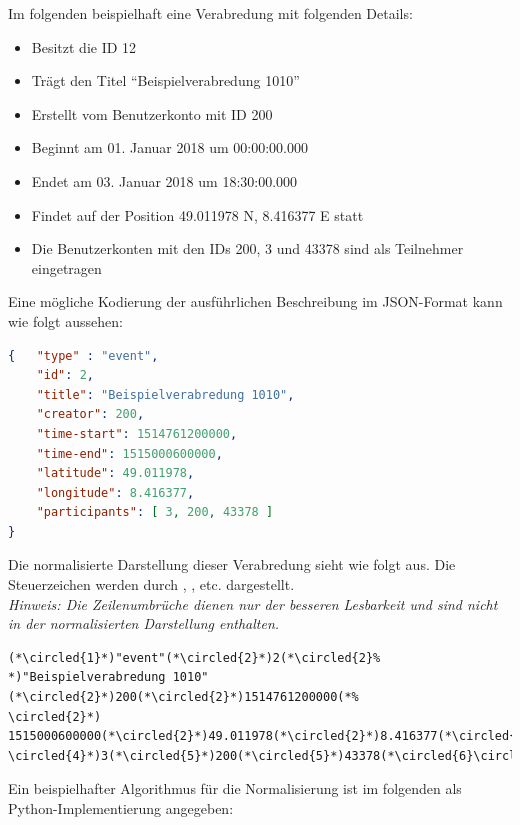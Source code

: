 \documentclass[parskip=full,11pt]{scrartcl}
\begin{document}
\par Im folgenden beispielhaft eine Verabredung mit folgenden Details:
\begin{itemize}
    \item Besitzt die ID 12
    \item Trägt den Titel \enquote{Beispielverabredung 1010}
    \item Erstellt vom Benutzerkonto mit ID 200
    \item Beginnt am 01. Januar 2018 um 00:00:00.000
    \item Endet am 03. Januar 2018 um 18:30:00.000
    \item Findet auf der Position 49.011978 N, 8.416377 E statt
    \item Die Benutzerkonten mit den IDs 200, 3 und 43378 sind als Teilnehmer
        eingetragen
\end{itemize}

Eine mögliche Kodierung der ausführlichen Beschreibung im JSON-Format kann wie
folgt aussehen:
\begin{lstlisting}[language=json,firstnumber=1]
{   "type" : "event",
    "id": 2,
    "title": "Beispielverabredung 1010",
    "creator": 200,
    "time-start": 1514761200000,
    "time-end": 1515000600000,
    "latitude": 49.011978,
    "longitude": 8.416377,
    "participants": [ 3, 200, 43378 ]
}
\end{lstlisting}

\newcommand*\circled[1]{\tikz[baseline=(char.base)]{
            \node[shape=circle,draw,inner sep=1pt] (char) {\scriptsize #1};}}

Die normalisierte Darstellung dieser Verabredung sieht wie folgt aus.
Die Steuerzeichen werden durch \circled{1}, \circled{2}, \circled{3} etc.
dargestellt.\\
\textit{Hinweis: Die Zeilenumbrüche dienen nur der besseren Lesbarkeit und sind
nicht in der normalisierten Darstellung enthalten.}

\begin{lstlisting}[language=norm,firstnumber=1]
(*\circled{1}*)"event"(*\circled{2}*)2(*\circled{2}%
*)"Beispielverabredung 1010"(*\circled{2}*)200(*\circled{2}*)1514761200000(*%
\circled{2}*)
1515000600000(*\circled{2}*)49.011978(*\circled{2}*)8.416377(*\circled{2}%
\circled{4}*)3(*\circled{5}*)200(*\circled{5}*)43378(*\circled{6}\circled{3}*)
\end{lstlisting}

\par Ein beispielhafter Algorithmus für die Normalisierung ist im folgenden
als Python-Implementierung angegeben:
\end{document}
